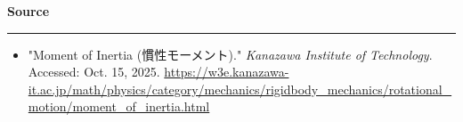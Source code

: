 \documentclass[11pt, dvipdfmx]{jsarticle}
\begin{document}
\vspace{1cm}

\noindent\large{\textbf{Source}}
\hrule
\begin{itemize}
    \item "Moment of Inertia (慣性モーメント)." \textit{Kanazawa Institute of Technology}. Accessed: Oct. 15, 2025. \url{https://w3e.kanazawa-it.ac.jp/math/physics/category/mechanics/rigidbody_mechanics/rotational_motion/moment_of_inertia.html}
\end{itemize}
\end{document}
